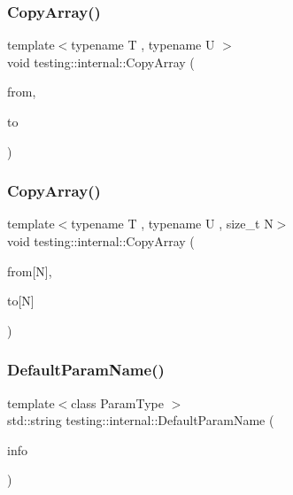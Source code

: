 \subsubsection{\texorpdfstring{Copy\+Array()}{CopyArray()}\hspace{0.1cm}{\footnotesize\ttfamily [2/3]}}
{\footnotesize\ttfamily template$<$typename T , typename U $>$ \\
void testing\+::internal\+::\+Copy\+Array (\begin{DoxyParamCaption}\item[{const T \&}]{from,  }\item[{U $\ast$}]{to }\end{DoxyParamCaption})\hspace{0.3cm}{\ttfamily [inline]}}

\mbox{\label{namespacetesting_1_1internal_a1e7ae855686720615dcd5754c8181c62}} 
\subsubsection{\texorpdfstring{Copy\+Array()}{CopyArray()}\hspace{0.1cm}{\footnotesize\ttfamily [3/3]}}
{\footnotesize\ttfamily template$<$typename T , typename U , size\+\_\+t N$>$ \\
void testing\+::internal\+::\+Copy\+Array (\begin{DoxyParamCaption}\item[{const T(\&)}]{from\mbox{[}\+N\mbox{]},  }\item[{U($\ast$)}]{to\mbox{[}\+N\mbox{]} }\end{DoxyParamCaption})\hspace{0.3cm}{\ttfamily [inline]}}

\mbox{\label{namespacetesting_1_1internal_a954ec4a8a932dac7743e77e459ffefdc}} 
\subsubsection{\texorpdfstring{Default\+Param\+Name()}{DefaultParamName()}}
{\footnotesize\ttfamily template$<$class Param\+Type $>$ \\
std\+::string testing\+::internal\+::\+Default\+Param\+Name (\begin{DoxyParamCaption}\item[{const \hyperlink{structtesting_1_1TestParamInfo}{Test\+Param\+Info}$<$ Param\+Type $>$ \&}]{info }\end{DoxyParamCaption})}

